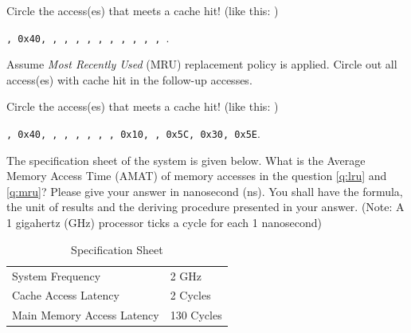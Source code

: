 \begin{questions}
{
    \begin{solution}
        Circle the access(es) that meets a cache hit!
        (like this: \texttt{})\\
        \begin{center}
        \texttt{, 0x40, , , , , , , ,
        , , , }.
        \end{center}
        \vspace{7px}
    \end{solution}
}

\question[2] Assume \emph{Most Recently Used} (MRU) replacement policy
is applied. Circle out all access(es) with cache hit in the follow-up
accesses. \label{q:mru}

{
    \begin{solution}
        Circle the access(es) that meets a cache hit!
        (like this: \texttt{})\\
        \begin{center}
        \texttt{, 0x40, , , , , , , 0x10,
        , 0x5C, 0x30, 0x5E}.
        \end{center}
        \vspace{7px}
    \end{solution}
}

\question[6] 
The specification sheet of the system is given below. What is the
Average Memory Access Time (AMAT) of memory accesses in the question
\ref{q:lru} and \ref{q:mru}? Please give your answer in nanosecond 
(ns). You shall have the formula, the unit of results and the
deriving procedure presented in your answer. (Note: A 1 gigahertz
(GHz) processor ticks a cycle for each 1 nanosecond)

\begin{table}[h]
    \centering
    \begin{tabular}{l l}
        \hline %
        System Frequency           & 2 GHz      \\
        Cache Access Latency       & 2 Cycles   \\
        Main Memory Access Latency & 130 Cycles \\
        \hline %
    \end{tabular}
    \caption{Specification Sheet}
    \label{tab:spec_sheet}
\end{table}


\end{questions}
